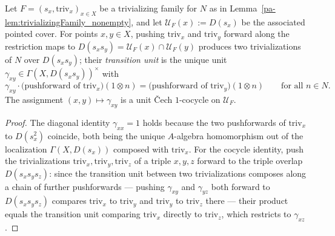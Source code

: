 \begin{definition}
  \label{pa-def:trivializingFamily_cocycle}
  \leanok

  Let \(F = (s_x, \mathrm{triv}_x)_{x \in X}\) be a trivializing family for \(N\) as in
  Lemma~\ref{pa-lem:trivializingFamily_nonempty}, and let \(\mathcal U_F(x) := D(s_x)\) be the
  associated pointed cover. For points \(x,y \in X\), pushing \(\mathrm{triv}_x\) and
  \(\mathrm{triv}_y\) forward along the restriction maps to \(D(s_xs_y) = \mathcal U_F(x) \cap
  \mathcal U_F(y)\) produces two trivializations of \(N\) over \(D(s_xs_y)\); their
  \emph{transition unit} is the unique unit \(\gamma_{xy} \in \Gamma(X,D(s_xs_y))^{\times}\)
  with
  \[
    \gamma_{xy} \cdot \bigl(\text{pushforward of } \mathrm{triv}_x\bigr)(1 \otimes n) =
    \bigl(\text{pushforward of } \mathrm{triv}_y\bigr)(1 \otimes n) \qquad \text{for all } n \in
    N.
  \]
  The assignment \((x,y) \mapsto \gamma_{xy}\) is a unit \v Cech \(1\)-cocycle on
  \(\mathcal U_F\).
\end{definition}
\begin{proof}
  \leanok
  The diagonal identity \(\gamma_{xx} = 1\) holds because the two pushforwards of
  \(\mathrm{triv}_x\) to \(D(s_x^2)\) coincide, both being the unique \(A\)-algebra
  homomorphism out of the localization \(\Gamma(X,D(s_x))\) composed with \(\mathrm{triv}_x\).
  For the cocycle identity, push the trivializations \(\mathrm{triv}_x, \mathrm{triv}_y,
  \mathrm{triv}_z\) of a triple \(x,y,z\) forward to the triple overlap \(D(s_xs_ys_z)\): since
  the transition unit between two trivializations composes along a chain of further
  pushforwards --- pushing \(\gamma_{xy}\) and \(\gamma_{yz}\) both forward to
  \(D(s_xs_ys_z)\) compares \(\mathrm{triv}_x\) to \(\mathrm{triv}_y\) and \(\mathrm{triv}_y\)
  to \(\mathrm{triv}_z\) there --- their product equals the transition unit comparing
  \(\mathrm{triv}_x\) directly to \(\mathrm{triv}_z\), which restricts to \(\gamma_{xz}\).
\end{proof}

